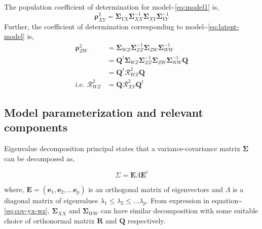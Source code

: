 \documentclass[12pt,A4paper,authoryear]{elsarticle} %
\providecommand{\tightlist}{%
  \setlength{\itemsep}{0pt}\setlength{\parskip}{0pt}}
\begin{document}
\begin{description}
\tightlist
\item[Population Coefficient of Determination]
The population coefficient of determination for
model\textasciitilde{}\eqref{eq:model1} is,
\[\boldsymbol{\rho}^2_{XY} = \boldsymbol{\Sigma}_{YX} \boldsymbol{\Sigma}_{XX}^{-1} \boldsymbol{\Sigma}_{XY} \boldsymbol{\Sigma}_{YY}^{-1}\]
Further, the coefficient of determination corresponding to
model\textasciitilde{}\eqref{eq:latent-model} is, \[
  \begin{aligned}
\boldsymbol{\rho}^2_{ZW} &= \boldsymbol{\Sigma}_{WZ} 
\boldsymbol{\Sigma}_{ZZ}^{-1} \boldsymbol{\Sigma}_{ZW} 
\boldsymbol{\Sigma}_{WW}^{-1} \\
  &=\mathbf{Q}^t
\boldsymbol{\Sigma}_{WZ}\boldsymbol{\Sigma}^{-1}_{ZZ}
\boldsymbol{\Sigma}_{ZW}\boldsymbol{\Sigma}_{WW}^{-1}\boldsymbol{Q} \nonumber \\
  &=\mathbf{Q}^t\boldsymbol{\mathcal{R}}^2_{WZ}\mathbf{Q} \nonumber \\
\text{i.e. }\boldsymbol{\mathcal{R}}^2_{WZ} 
  &=\mathbf{Q}\boldsymbol{\mathcal{R}}^2_{XY}\mathbf{Q}^t
  \end{aligned}
  \]
\end{description}

\subsection{Model parameterization and relevant
components}\label{model-parameter-relevant-components}

Eigenvalue decomposition principal states that a variance-covariance
matrix \(\boldsymbol{\Sigma}\) can be decomposed as,

\begin{equation}
  \Sigma = \mathbf{E}\Lambda \mathbf{E}^t
\end{equation}

where,
\(\mathbf{E} = (\mathbf{e}_1, \mathbf{e}_2, \ldots \mathbf{e}_p)\) is an
orthogonal matrix of eigenvectors and \(\Lambda\) is a diagonal matrix
of eigenvalues \(\lambda_1 \le \lambda_2 \le \ldots \lambda_p\). From
expression in equation\textasciitilde{}\eqref{eq:cov-yx-wz},
\(\boldsymbol{\Sigma}_{XX}\) and \(\boldsymbol{\Sigma}_{WW}\) can have
similar decomposition with some suitable choice of orthonormal matrix
\(\mathbf{R}\) and \(\mathbf{Q}\) respectively.
\end{document}

